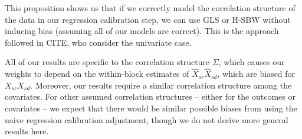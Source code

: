 \begin{remark}
    This proposition shows us that if we correctly model the correlation structure of the data in our regression calibration step, we can use GLS or H-SBW without inducing bias (assuming all of our models are correct). This is the approach followed in CITE, who consider the univariate case. 
\end{remark}

\begin{remark}
    All of our results are specific to the correlation structure $\Sigma$, which causes our weights to depend on the within-block estimates of $\hat{X}_{sc}\hat{X}_{sd}$, which are biased for $X_{sc}X_{sd}$. Moreover, our results require a similar correlation structure among the covariates. For other assumed correlation structures -- either for the outcomes or covariates -- we expect that there would be similar possible biases from using the naive regression calibration adjustment, though we do not derive more general results here.
\end{remark}

